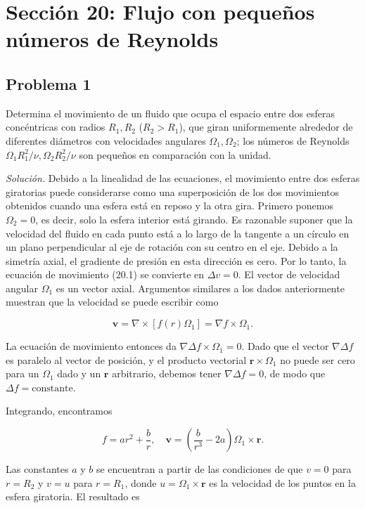 \documentclass{article}
\begin{document}
\section*{Sección 20: Flujo con pequeños números de Reynolds}

\subsection*{Problema 1}

Determina el movimiento de un fluido que ocupa el espacio entre dos esferas concéntricas con radios $R_1, R_2$ ($R_2 > R_1$), que giran uniformemente alrededor de diferentes diámetros con velocidades angulares $\Omega_1, \Omega_2$; los números de Reynolds $\Omega_1 R_1^2/\nu, \Omega_2 R_2^2/\nu$ son pequeños en comparación con la unidad.

\textit{Solución.} Debido a la linealidad de las ecuaciones, el movimiento entre dos esferas giratorias puede considerarse como una superposición de los dos movimientos obtenidos cuando una esfera está en reposo y la otra gira. Primero ponemos $\Omega_2 = 0$, es decir, solo la esfera interior está girando. Es razonable suponer que la velocidad del fluido en cada punto está a lo largo de la tangente a un círculo en un plano perpendicular al eje de rotación con su centro en el eje. Debido a la simetría axial, el gradiente de presión en esta dirección es cero. Por lo tanto, la ecuación de movimiento (20.1) se convierte en $\Delta v = 0$. El vector de velocidad angular $\Omega_1$ es un vector axial. Argumentos similares a los dados anteriormente muestran que la velocidad se puede escribir como

$$
\mathbf{v} = \nabla \times [f(r) \Omega_1] = \nabla f \times \Omega_1.
$$

La ecuación de movimiento entonces da $\nabla \Delta f \times \Omega_1 = 0$. Dado que el vector $\nabla \Delta f$ es paralelo al vector de posición, y el producto vectorial $\mathbf{r} \times \Omega_1$ no puede ser cero para un $\Omega_1$ dado y un $\mathbf{r}$ arbitrario, debemos tener $\nabla \Delta f = 0$, de modo que $\Delta f = \text{constante}$.

Integrando, encontramos

$$
f = ar^2 + \frac{b}{r}, \quad \mathbf{v} = \left( \frac{b}{r^3} - 2a \right) \Omega_1 \times \mathbf{r}.
$$

Las constantes $a$ y $b$ se encuentran a partir de las condiciones de que $v = 0$ para $r = R_2$ y $v = u$ para $r = R_1$, donde $u = \Omega_1 \times \mathbf{r}$ es la velocidad de los puntos en la esfera giratoria. El resultado es
\end{document}
